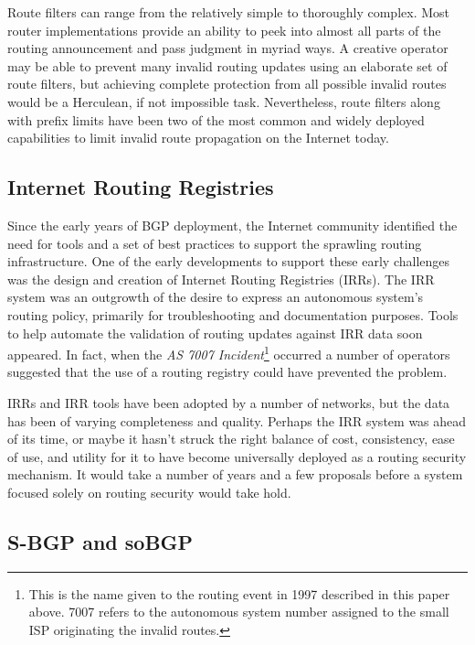 \documentclass[sigconf]{acmart}
\begin{document}
Route filters can range from the relatively simple to thoroughly
complex.  Most router implementations provide an ability to peek into
almost all parts of the routing announcement and pass judgment in myriad
ways.  A creative operator may be able to prevent many invalid routing
updates using an elaborate set of route filters, but achieving complete
protection from all possible invalid routes would be a Herculean, if not
impossible task.  Nevertheless, route filters along with prefix limits
have been two of the most common and widely deployed capabilities to
limit invalid route propagation on the Internet
today.\cite{durand_bgp_2015}

\subsection{Internet Routing Registries}

Since the early years of BGP deployment, the Internet community
identified the need for tools and a set of best practices to support the
sprawling routing infrastructure.  One of the early developments to
support these early challenges was the design and creation of Internet
Routing Registries (IRRs).\cite{bates_representation_1995}  The IRR
system was an outgrowth of the desire to express an autonomous system's
routing policy, primarily for troubleshooting and documentation
purposes.  Tools to help automate the validation of routing updates
against IRR data soon appeared.  In fact, when the \emph{AS 7007
Incident}\footnote{This is the name given to the routing event in 1997
described in this paper above.  7007 refers to the autonomous system
number assigned to the small ISP originating the invalid routes.}
occurred a number of operators suggested that the use of a routing
registry could have prevented the problem.

IRRs and IRR tools have been adopted by a number of networks, but the
data has been of varying completeness and
quality.\cite{khan_comparative_2013}  Perhaps the IRR system was ahead
of its time, or maybe it hasn't struck the right balance of cost,
consistency, ease of use, and utility for it to have become universally
deployed as a routing security mechanism.  It would take a number of
years and a few proposals before a system focused solely on routing
security would take hold.

\subsection{S-BGP and soBGP}
\end{document}
